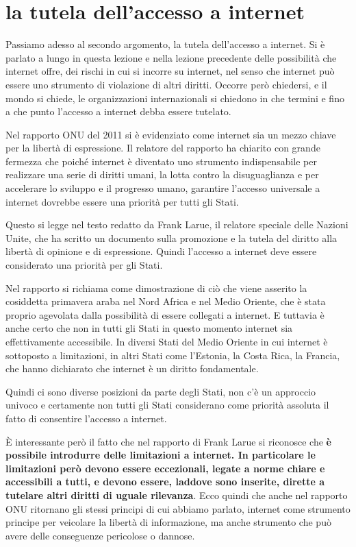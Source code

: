  \section{la tutela dell'accesso a internet}
 Passiamo adesso al secondo argomento, la tutela dell'accesso a internet. Si è parlato a lungo in questa lezione e nella lezione precedente delle possibilità che internet offre, dei rischi in cui si incorre su internet, nel senso che internet può essere uno strumento di violazione di altri diritti. Occorre però chiedersi, e il mondo si chiede, le organizzazioni internazionali si chiedono in che termini e fino a che punto l'accesso a internet debba essere tutelato. \par
 Nel rapporto ONU del 2011 si è evidenziato come internet sia un mezzo chiave per la libertà di espressione. Il relatore del rapporto ha chiarito con grande fermezza che poiché internet è diventato uno strumento indispensabile per realizzare una serie di diritti umani, la lotta contro la disuguaglianza e per accelerare lo sviluppo e il progresso umano, garantire l'accesso universale a internet dovrebbe essere una priorità per tutti gli Stati. \par
 Questo si legge nel testo redatto da Frank Larue, il relatore speciale delle Nazioni Unite, che ha scritto un documento sulla promozione e la tutela del diritto alla libertà di opinione e di espressione. Quindi l'accesso a internet deve essere considerato una priorità per gli Stati. \par
 Nel rapporto si richiama come dimostrazione di ciò che viene asserito la cosiddetta primavera araba nel Nord Africa e nel Medio Oriente, che è stata proprio agevolata dalla possibilità di essere collegati a internet. E tuttavia è anche certo che non in tutti gli Stati in questo momento internet sia effettivamente accessibile. In diversi Stati del Medio Oriente in cui internet è sottoposto a limitazioni, in altri Stati come l'Estonia, la Costa Rica, la Francia, che hanno dichiarato che internet è un diritto fondamentale. \par
 Quindi ci sono diverse posizioni da parte degli Stati, non c'è un approccio univoco e certamente non tutti gli Stati considerano come priorità assoluta il fatto di consentire l'accesso a internet. \par
 È interessante però il fatto che nel rapporto di Frank Larue si riconosce che \textbf{è possibile introdurre delle limitazioni a internet. In particolare le limitazioni però devono essere eccezionali, legate a norme chiare e accessibili a tutti, e devono essere, laddove sono inserite, dirette a tutelare altri diritti di uguale rilevanza}. Ecco quindi che anche nel rapporto ONU ritornano gli stessi principi di cui abbiamo parlato, internet come strumento principe per veicolare la libertà di informazione, ma anche strumento che può avere delle conseguenze pericolose o dannose.\par 
